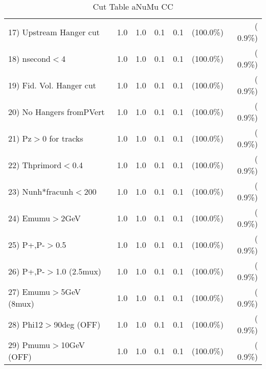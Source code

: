 \begin{table}[h!]
\begin{tabular}{||l||r|r|r|r|r|r||}
 17) Upstream Hanger cut  &          1.0 &          1.0 &          0.1 &          0.1 & (100.0\%) & (  0.9\%) \\
 18) nsecond$<$4          &          1.0 &          1.0 &          0.1 &          0.1 & (100.0\%) & (  0.9\%) \\
 19) Fid. Vol. Hanger cut &          1.0 &          1.0 &          0.1 &          0.1 & (100.0\%) & (  0.9\%) \\
 20) No Hangers fromPVert &          1.0 &          1.0 &          0.1 &          0.1 & (100.0\%) & (  0.9\%) \\
 21) Pz$>$0 for tracks    &          1.0 &          1.0 &          0.1 &          0.1 & (100.0\%) & (  0.9\%) \\
 22) Thprimord$<$0.4      &          1.0 &          1.0 &          0.1 &          0.1 & (100.0\%) & (  0.9\%) \\
 23) Nunh*fracunh$<$200   &          1.0 &          1.0 &          0.1 &          0.1 & (100.0\%) & (  0.9\%) \\
 24) Emumu$>$2GeV         &          1.0 &          1.0 &          0.1 &          0.1 & (100.0\%) & (  0.9\%) \\
 25) P+,P-$>$0.5          &          1.0 &          1.0 &          0.1 &          0.1 & (100.0\%) & (  0.9\%) \\
 26) P+,P-$>$1.0 (2.5mux) &          1.0 &          1.0 &          0.1 &          0.1 & (100.0\%) & (  0.9\%) \\
 27) Emumu$>$5GeV  (8mux) &          1.0 &          1.0 &          0.1 &          0.1 & (100.0\%) & (  0.9\%) \\
 28) Phi12$>$90deg  (OFF) &          1.0 &          1.0 &          0.1 &          0.1 & (100.0\%) & (  0.9\%) \\
 29) Pmumu$>$10GeV  (OFF) &          1.0 &          1.0 &          0.1 &          0.1 & (100.0\%) & (  0.9\%) \\
 \hline
 \hline
 \end{tabular}
 \caption{Cut Table  aNuMu CC }
 \label{tab-cutcohjpsi-mumu_res}
 \end{table}

